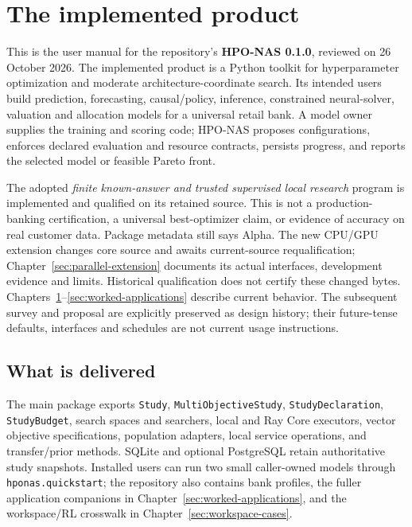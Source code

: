 \chapter{The implemented product}
\label{sec:current-product}

This is the user manual for the repository's \textbf{HPO-NAS 0.1.0}, reviewed
on 26 October 2026. The implemented product is a Python toolkit for
hyperparameter optimization and moderate architecture-coordinate search. Its
intended users build prediction, forecasting, causal/policy, inference,
constrained neural-solver, valuation and allocation models for a universal
retail bank. A model owner supplies the training and scoring code; HPO-NAS
proposes configurations, enforces declared evaluation and resource contracts,
persists progress, and reports the selected model or feasible Pareto front.

\begin{decisions}
The adopted \emph{finite known-answer and trusted supervised local research}
program is implemented and qualified on its retained source. This is not a
production-banking certification, a universal best-optimizer claim, or evidence
of accuracy on real customer data. Package metadata still says Alpha.
The new CPU/GPU extension changes core source and awaits current-source
requalification; Chapter~\ref{sec:parallel-extension} documents its actual
interfaces, development evidence and limits. Historical qualification does
not certify these changed bytes.
Chapters~\ref{sec:current-product}--\ref{sec:worked-applications} describe
current behavior. The subsequent survey and proposal are explicitly preserved
as design history; their future-tense defaults, interfaces and schedules are
not current usage instructions.
\end{decisions}

\section{What is delivered}

The main package exports \texttt{Study}, \texttt{MultiObjectiveStudy},
\texttt{StudyDeclaration}, \texttt{StudyBudget}, search spaces and searchers,
local and Ray Core executors, vector objective specifications, population
adapters, local service operations, and transfer/prior methods. SQLite and
optional PostgreSQL retain authoritative study snapshots. Installed users can
run two small caller-owned models through \texttt{hponas.quickstart}; the
repository also contains bank profiles, the fuller application companions in
Chapter~\ref{sec:worked-applications}, and the workspace/RL crosswalk in
Chapter~\ref{sec:workspace-cases}.

